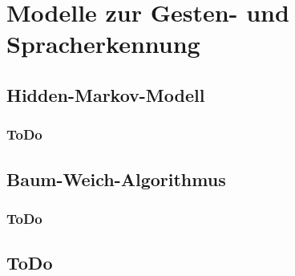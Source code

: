 \chapter{Modelle zur Gesten- und Spracherkennung}
\label{chap:Modelle}

\section{Hidden-Markov-Modell}
\subsection{ToDo}

\section{Baum-Weich-Algorithmus}

\subsection{ToDo}

\section{ToDo}
